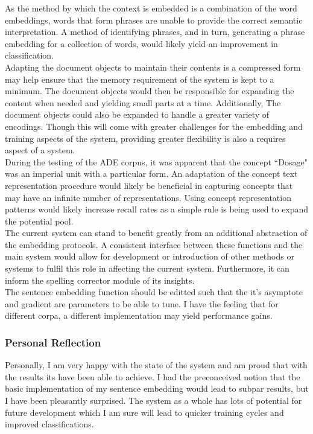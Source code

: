 \documentclass[12pt]{article} %
\begin{document}
As the method by which the context is embedded is a combination of the word embeddings, words that form phrases are unable to provide the correct semantic interpretation. A method of identifying phrases, and in turn, generating a phrase embedding for a collection of words, would likely yield an improvement in classification.\\

Adapting the document objects to maintain their contents is a compressed form may help ensure that the memory requirement of the system is kept to a minimum. The document objects would then be responsible for expanding the content when needed and yielding small parts at a time. Additionally, The document objects could also be expanded to handle a greater variety of encodings. Though this will come with greater challenges for the embedding and training aspects of the system, providing greater flexibility is also a requires aspect of a system.\\

During the testing of the ADE corpus, it was apparent that the concept ``Dosage" was an imperial unit with a particular form. An adaptation of the concept text representation procedure would likely be beneficial in capturing concepts that may have an infinite number of representations. Using concept representation patterns would likely increase recall rates as a simple rule is being used to expand the potential pool.\\

The current system can stand to benefit greatly from an additional abstraction of the embedding protocols. A consistent interface between these functions and the main system would allow for development or introduction of other methods or systems to fulfil this role in affecting the current system. Furthermore, it can inform the spelling corrector module of its insights.\\

The sentence embedding function should be editted such that the it's asymptote and gradient are parameters to be able to tune. I have the feeling that for different corpa, a different implementation may yield performance gains.

\subsubsection{Personal Reflection}

Personally, I am very happy with the state of the system and am proud that with the results its have been able to achieve. I had the preconceived notion that the basic implementation of my sentence embedding would lead to subpar results, but I have been pleasantly surprised. The system as a whole has lots of potential for future development which I am sure will lead to quicker training cycles and improved classifications.  
\end{document}
